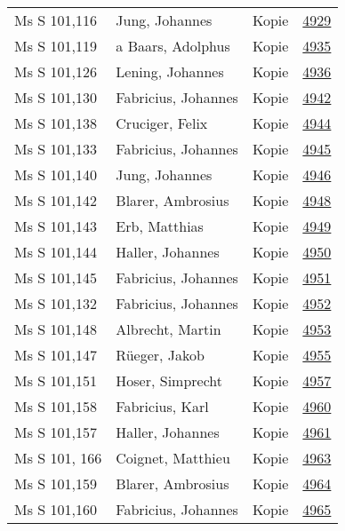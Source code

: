 \documentclass[10pt,a4paper,landscape]{report}
\begin{document}
\begin{longtable}{p{16cm}p{4cm}lr}
Ms S 101,116	&	Jung, Johannes	&	Kopie	&	\href{http://130.60.24.72/assignment/4929}{4929}\\
Ms S 101,119	&	a Baars, Adolphus	&	Kopie	&	\href{http://130.60.24.72/assignment/4935}{4935}\\
Ms S 101,126	&	Lening, Johannes	&	Kopie	&	\href{http://130.60.24.72/assignment/4936}{4936}\\
Ms S 101,130	&	Fabricius, Johannes	&	Kopie	&	\href{http://130.60.24.72/assignment/4942}{4942}\\
Ms S 101,138	&	Cruciger, Felix	&	Kopie	&	\href{http://130.60.24.72/assignment/4944}{4944}\\
Ms S 101,133	&	Fabricius, Johannes	&	Kopie	&	\href{http://130.60.24.72/assignment/4945}{4945}\\
Ms S 101,140	&	Jung, Johannes	&	Kopie	&	\href{http://130.60.24.72/assignment/4946}{4946}\\
Ms S 101,142	&	Blarer, Ambrosius	&	Kopie	&	\href{http://130.60.24.72/assignment/4948}{4948}\\
Ms S 101,143	&	Erb, Matthias	&	Kopie	&	\href{http://130.60.24.72/assignment/4949}{4949}\\
Ms S 101,144	&	Haller, Johannes	&	Kopie	&	\href{http://130.60.24.72/assignment/4950}{4950}\\
Ms S 101,145	&	Fabricius, Johannes	&	Kopie	&	\href{http://130.60.24.72/assignment/4951}{4951}\\
Ms S 101,132	&	Fabricius, Johannes	&	Kopie	&	\href{http://130.60.24.72/assignment/4952}{4952}\\
Ms S 101,148	&	Albrecht, Martin	&	Kopie	&	\href{http://130.60.24.72/assignment/4953}{4953}\\
Ms S 101,147	&	Rüeger, Jakob	&	Kopie	&	\href{http://130.60.24.72/assignment/4955}{4955}\\
Ms S 101,151	&	Hoser, Simprecht	&	Kopie	&	\href{http://130.60.24.72/assignment/4957}{4957}\\
Ms S 101,158	&	Fabricius, Karl	&	Kopie	&	\href{http://130.60.24.72/assignment/4960}{4960}\\
Ms S 101,157	&	Haller, Johannes	&	Kopie	&	\href{http://130.60.24.72/assignment/4961}{4961}\\
Ms S 101, 166	&	Coignet, Matthieu	&	Kopie	&	\href{http://130.60.24.72/assignment/4963}{4963}\\
Ms S 101,159	&	Blarer, Ambrosius	&	Kopie	&	\href{http://130.60.24.72/assignment/4964}{4964}\\
Ms S 101,160	&	Fabricius, Johannes	&	Kopie	&	\href{http://130.60.24.72/assignment/4965}{4965}\\

\end{longtable}
\end{document}
